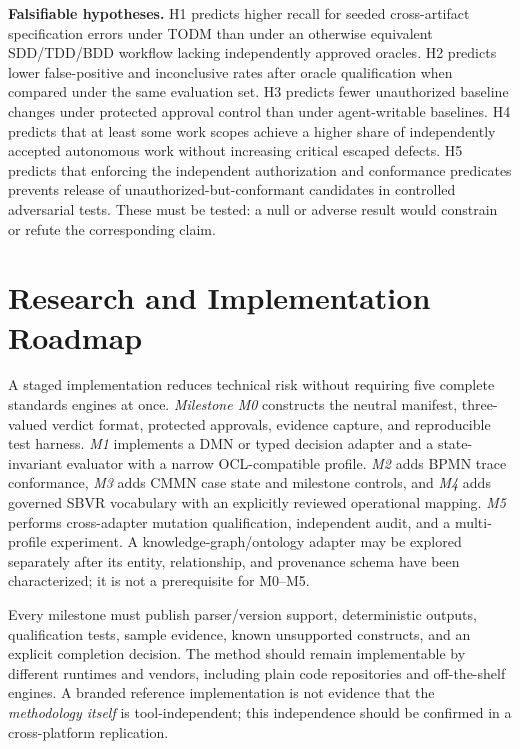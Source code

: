 \documentclass[11pt,a4paper]{article}
\begin{document}
\textbf{Falsifiable hypotheses.} H1 predicts higher recall for seeded cross-artifact specification errors under TODM than under an otherwise equivalent SDD/TDD/BDD workflow lacking independently approved oracles. H2 predicts lower false-positive and inconclusive rates after oracle qualification when compared under the same evaluation set. H3 predicts fewer unauthorized baseline changes under protected approval control than under agent-writable baselines. H4 predicts that at least some work scopes achieve a higher share of independently accepted autonomous work without increasing critical escaped defects. H5 predicts that enforcing the independent authorization and conformance predicates prevents release of unauthorized-but-conformant candidates in controlled adversarial tests. These must be tested: a null or adverse result would constrain or refute the corresponding claim.

\section{Research and Implementation Roadmap}
A staged implementation reduces technical risk without requiring five complete standards engines at once. \emph{Milestone M0} constructs the neutral manifest, three-valued verdict format, protected approvals, evidence capture, and reproducible test harness. \emph{M1} implements a DMN or typed decision adapter and a state-invariant evaluator with a narrow OCL-compatible profile. \emph{M2} adds BPMN trace conformance, \emph{M3} adds CMMN case state and milestone controls, and \emph{M4} adds governed SBVR vocabulary with an explicitly reviewed operational mapping. \emph{M5} performs cross-adapter mutation qualification, independent audit, and a multi-profile experiment. A knowledge-graph/ontology adapter may be explored separately after its entity, relationship, and provenance schema have been characterized; it is not a prerequisite for M0--M5.

Every milestone must publish parser/version support, deterministic outputs, qualification tests, sample evidence, known unsupported constructs, and an explicit completion decision. The method should remain implementable by different runtimes and vendors, including plain code repositories and off-the-shelf engines. A branded reference implementation is not evidence that the \emph{methodology itself} is tool-independent; this independence should be confirmed in a cross-platform replication.




\end{document}
